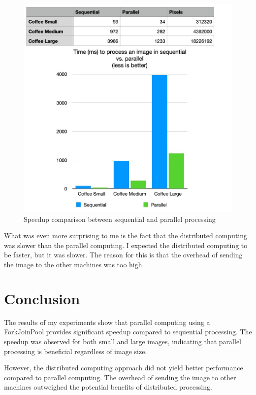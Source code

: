 \documentclass{article}
\begin{document}
\begin{multicols}{2}
    \begin{figure}[H]
        \centering
        \includegraphics[width=\linewidth]{img/coffee_speedup.jpg}
        \caption{Speedup comparison between sequential and parallel processing}
        \label{fig:speedup}
    \end{figure}

    What was even more surprising to me is the fact that the distributed computing was slower than the parallel computing. I expected the distributed computing to be faster, but it was slower. The reason for this is that the overhead of sending the image to the other machines was too high.

    \section{Conclusion}

    The results of my experiments show that parallel computing using a ForkJoinPool provides significant speedup compared to sequential processing. The speedup was observed for both small and large images, indicating that parallel processing is beneficial regardless of image size.

    However, the distributed computing approach did not yield better performance compared to parallel computing. The overhead of sending the image to other machines outweighed the potential benefits of distributed processing.

    \newpage



\end{multicols}

\printbibliography[heading=bibintoc, title={References}]
\end{document}
